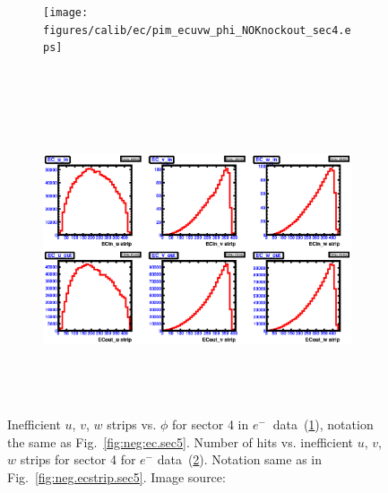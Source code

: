 \begin{figure}[!ht]
  \centering
  \begin{subfigure}[b]{\figwidth}
  \texttt{[image: figures/calib/ec/pim\_ecuvw\_phi\_NOKnockout\_sec4.eps]}\caption{}\label{fig:EC_I_IV}
  \end{subfigure}%
  \\
  \begin{subfigure}[b]{\figwidth}
  \includegraphics[width=\figwidth, height=3.5in,valign=c]{figures/calib/ec/pim_ecuvw_NOKnockout_sec4.eps}\caption{}\label{fig:EC_II_IV}
  \end{subfigure}%
      \caption {Inefficient  $u$, $v$, $w$ strips vs. $\phi$ for sector 4 in  $e^{-} \ $ data~(\ref{fig:EC_I_IV}), notation the same as Fig.~\ref{fig:neg:ec.sec5}. Number of hits vs. inefficient  $u$, $v$, $w$ strips for sector 4 for $e^-$ data~(\ref{fig:EC_II_IV}). Notation same as in Fig.~\ref{fig:neg.ecstrip.sec5}. Image source:~\cite{clas.thesis.kunkel}}
        \label{fig:EC_no_IV}
\end{figure}



